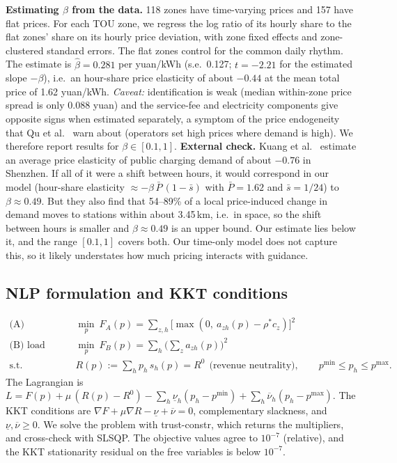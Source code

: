 \documentclass[11pt,a4paper]{article}
\begin{document}
\textbf{Estimating $\beta$ from the data.} 118 zones have time-varying prices and 157 have flat prices. For each TOU zone, we regress the log ratio of its hourly share to the flat zones' share on its hourly price deviation, with zone fixed effects and zone-clustered standard errors. The flat zones control for the common daily rhythm. The estimate is $\hat\beta = 0.281$ per yuan/kWh (s.e.\ 0.127; $t = -2.21$ for the estimated slope $-\beta$), i.e.\ an hour-share price elasticity of about $-0.44$ at the mean total price of 1.62 yuan/kWh. \emph{Caveat:} identification is weak (median within-zone price spread is only 0.088 yuan) and the service-fee and electricity components give opposite signs when estimated separately, a symptom of the price endogeneity that Qu et al.~\cite{qu2024} warn about (operators set high prices where demand is high). We therefore report results for $\beta \in [0.1, 1]$. \textbf{External check.} Kuang et al.~\cite{kuang2024} estimate an average price elasticity of public charging demand of about $-0.76$ in Shenzhen. If all of it were a shift between hours, it would correspond in our model (hour-share elasticity $\approx -\beta\,\bar P\,(1-\bar s)$ with $\bar P = 1.62$ and $\bar s = 1/24$) to $\beta \approx 0.49$. But they also find that 54--89\% of a local price-induced change in demand moves to stations within about 3.45\,km, i.e.\ in space, so the shift between hours is smaller and $\beta \approx 0.49$ is an upper bound. Our estimate lies below it, and the range $[0.1, 1]$ covers both. Our time-only model does not capture this, so it likely understates how much pricing interacts with guidance.

\subsection{NLP formulation and KKT conditions}
\begin{align*}
\text{(A) congestion-aware:}\quad &\min_{p}\ F_A(p) = \sum_{z,h}\big[\max(0,\ a_{zh}(p) - \rho^* c_z)\big]^2\\
\text{(B) load flattening:}\quad &\min_{p}\ F_B(p) = \sum_h \Big(\sum_z a_{zh}(p)\Big)^2\\
\text{s.t.}\quad & R(p) := \sum_h p_h\,s_h(p) = R^0\ \ \text{(revenue neutrality)},\qquad p^{\min}\le p_h \le p^{\max}.
\end{align*}
The Lagrangian is $L = F(p) + \mu\,(R(p) - R^0) - \sum_h \underline{\nu}_h (p_h - p^{\min}) + \sum_h \overline{\nu}_h(p_h - p^{\max})$. The KKT conditions are $\nabla F + \mu\nabla R - \underline\nu + \overline\nu = 0$, complementary slackness, and $\underline\nu, \overline\nu \ge 0$. We solve the problem with trust-constr, which returns the multipliers, and cross-check with SLSQP. The objective values agree to $10^{-7}$ (relative), and the KKT stationarity residual on the free variables is below $10^{-7}$.
\end{document}
